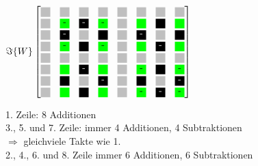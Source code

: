 \begin{frame}[t]
\begin{minipage}{0.45\textwidth}
   \vspace{0.5cm}
   $\Im\{W\}
   \begin{bmatrix}
     \myboxZero 	& \myboxZero 		& \myboxZero 	& \myboxZero 		& \myboxZero 	& \myboxZero 		& \myboxZero 	& \myboxZero \\
     \myboxZero 	& \myboxSqrtNeg 	& \myboxOneNeg 	& \myboxSqrtNeg		& \myboxZero	& \myboxSqrtPos		& \myboxOnePos	& \myboxSqrtPos \\
     \myboxZero 	& \myboxOneNeg 		& \myboxZero 	& \myboxOnePos 		& \myboxZero 	& \myboxOneNeg 		& \myboxZero 	& \myboxOnePos \\
     \myboxZero 	& \myboxSqrtNeg 	& \myboxOnePos 	& \myboxSqrtNeg 	& \myboxZero 	& \myboxSqrtPos 	& \myboxOneNeg 	& \myboxSqrtPos \\
     \myboxZero 	& \myboxZero 		& \myboxZero 	& \myboxZero 		& \myboxZero 	& \myboxZero 		& \myboxZero 	& \myboxZero \\
     \myboxZero 	& \myboxSqrtPos 	& \myboxOneNeg 	& \myboxSqrtPos		& \myboxZero 	& \myboxSqrtNeg 	& \myboxOnePos 	& \myboxSqrtNeg \\
     \myboxZero 	& \myboxOnePos 		& \myboxZero 	& \myboxOneNeg 		& \myboxZero 	& \myboxOnePos 		& \myboxZero 	& \myboxOneNeg \\
     \myboxZero 	& \myboxSqrtPos 	& \myboxOnePos 	& \myboxSqrtPos		& \myboxZero	& \myboxSqrtNeg		& \myboxOneNeg	& \myboxSqrtNeg 
    \end{bmatrix}
   $
\endgroup
\end{minipage}
\begin{minipage}{0.45\textwidth}
 1. Zeile: 8 Additionen\\
 
 \vspace{0.5cm}
 3., 5. und 7. Zeile: immer 4 Additionen, 4 Subtraktionen \\
 $\Rightarrow$ gleichviele Takte wie 1.\\
 
 \vspace{0.5cm}
 2., 4., 6. und 8. Zeile immer 6 Additionen, 6 Subtraktionen
\end{minipage}
\end{frame}




